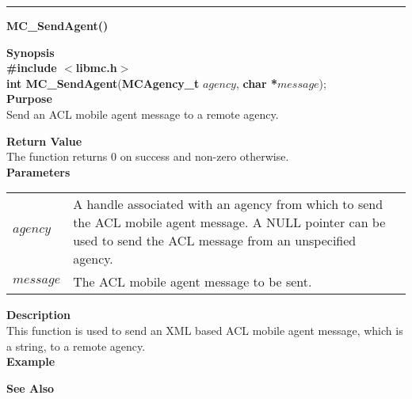 \noindent
\vspace{5pt}
\rule{6.5in}{.01in}
\noindent
{\LARGE \bf MC\_SendAgent()} \\
{}

\noindent
{\bf Synopsis}\\
{\bf \#include $<$libmc.h$>$}\\
{\bf int MC\_SendAgent}({\bf MCAgency\_t} $agency$, {\bf char *}$message$);\\

\noindent
{\bf Purpose}\\
Send an ACL mobile agent message to a remote agency.

\noindent
{\bf Return Value}\\
The function returns 0 on success and non-zero otherwise.\\

\noindent
{\bf Parameters}
\vspace{-0.1in}
\begin{description}
\item
\begin{tabular}{p{20 mm}p{135 mm}}
$agency$ & A handle associated with an agency from which to send the ACL 
mobile agent message. A NULL pointer can be used to send the ACL message 
from an unspecified agency.\\ 
$message$ & The ACL mobile agent message to be sent.\\
\end{tabular}
\end{description}

\noindent
{\bf Description}\\
This function is used to send an XML based ACL mobile agent message, which 
is a string, to a remote agency. \\

\noindent
{\bf Example}\\
\noindent

\noindent
{\bf See Also}\\

